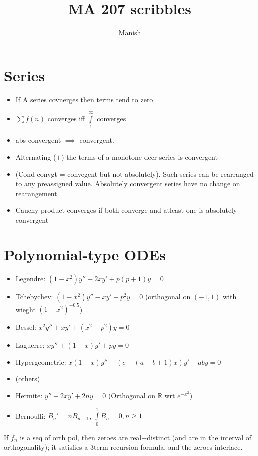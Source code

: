 \documentclass[12pt]{article}
\title{MA 207 scribbles}
\author{Manish}
\begin{document}
\maketitle

\section{Series}
\begin{itemize}
\item If A series covnerges then terms tend to zero
\item $\sum f(n)$ converges iff $\int\limits_1^\infty$ converges
\item abs convergent $\implies$ convergent.
\item Alternating ($\pm$) the terms of a monotone decr series is convergent
\item (Cond convgt = convegent but not absolutely). Such series can be rearranged to any preassigned value. Absolutely convergent series have no change on rearangement.
\item Cauchy product converges if both converge and atleast one is absolutely convergent
\end{itemize}
\section{Polynomial-type ODEs}

\begin{itemize}
\item Legendre: $(1 -x^2)y'' - 2xy' + p(p + 1)y = 0$
\item Tchebychev: $(1-x^2)y'' - xy'+p^2y=0$ (orthogonal on $(-1,1)$ with wieght $(1-x^2)^{-0.5}$)
\item Bessel: $x^2y'' +xy' + (x^2-p^2)y=0$
\item Laguerre: $xy'' + (1-x)y' + py=0$
\item Hypergeometric: $x(1-x)y'' + (c- (a+b+1)x)y'-aby=0$
\item (others)
\item Hermite: $y''-2xy'+2ny=0$ (Orthogonal on $\mathbb R$ wrt $e^{-x^2}$)
\item Bernoulli: $B_n'=nB_{n-1}$, $\int\limits_0^1 B_n=0, n\geq 1$
\end{itemize}

If ${f_n}$ is a seq of orth pol, then zeroes are real+distinct (and are in the interval of orthogonality); it satisfies a 3term recursion formula, and the zeroes interlace.
\end{document}
